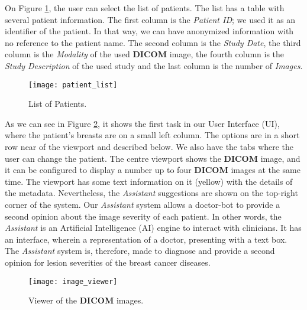 \clearpage

On Figure \ref{fig:patient_list}, the user can select the list of patients. The list has a table with several patient information. The first column is the \textit{Patient ID}; we used it as an identifier of the patient. In that way, we can have anonymized information with no reference to the patient name. The second column is the \textit{Study Date}, the third column is the \textit{Modality} of the used \textbf{DICOM} image, the fourth column is the \textit{Study Description} of the used study and the last column is the number of \textit{Images}.


\hfill

\begin{figure}[h]
\centering
\texttt{[image: patient\_list]}
\caption{List of Patients.}
\label{fig:patient_list}
\end{figure}

\hfill


As we can see in Figure \ref{fig:image_viewer}, it shows the first task in our User Interface (UI), where the patient's breasts are on a small left column. The options are in a short row near of the viewport and described below. We also have the tabs where the user can change the patient. The centre viewport shows the \textbf{DICOM} image, and it can be configured to display a number up to four \textbf{DICOM} images at the same time. The viewport has some text information on it (yellow) with the details of the metadata. Nevertheless, the \textit{Assistant} suggestions are shown on the top-right corner of the system. Our \textit{Assistant} system allows a doctor-bot to provide a second opinion about the image severity of each patient. In other words, the \textit{Assistant} is an Artificial Intelligence (AI) engine to interact with clinicians. It has an interface, wherein a representation of a doctor, presenting with a text box. The \textit{Assistant} system is, therefore, made to diagnose and provide a second opinion for lesion severities of the breast cancer diseases.

\clearpage


\hfill

\begin{figure}[h]
\centering
\texttt{[image: image\_viewer]}
\caption{Viewer of the \textbf{DICOM} images.}
\label{fig:image_viewer}
\end{figure}

